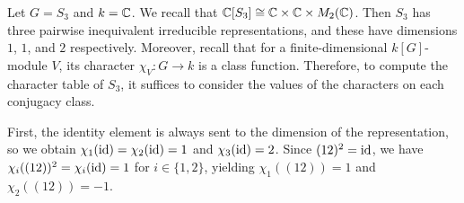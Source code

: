 \begin{exmp}
    Let $G = S_3$ and $k = \mathbb{C}$. We recall that $\mathbb{C}[S_3] \cong \mathbb{C} \times 
    \mathbb{C} \times M_2(\mathbb{C})$. Then $S_3$ has three pairwise inequivalent irreducible 
    representations, and these have dimensions $1$, $1$, and $2$ 
    respectively. Moreover, recall that for a finite-dimensional 
    $k[G]$-module $V$, its character $\chi_V : G \to k$ is a class function. 
    Therefore, to compute the character table of $S_3$, it suffices to 
    consider the values of the characters on each conjugacy class. 

    First, the identity element is always sent to the dimension of the 
    representation, so we obtain $\chi_1(\operatorname{id}) = \chi_2(\operatorname{id}) = 1$ and 
    $\chi_3(\operatorname{id}) = 2$. Since $(12)^2 = \operatorname{id}$, we have $\chi_i((12))^2 
    = \chi_i(\operatorname{id}) = 1$ for $i \in \{1, 2\}$, yielding 
    $\chi_1((12)) = 1$ and $\chi_2((12)) = -1$. 


\end{exmp}
